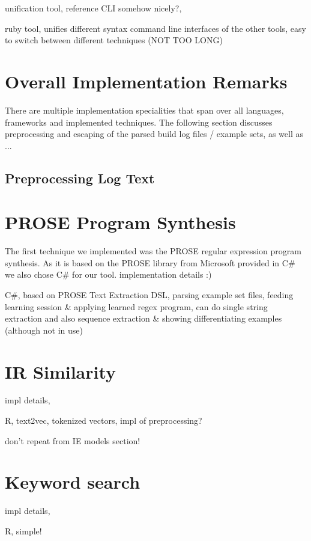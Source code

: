 \documentclass[\myrootdir/main.tex]{subfiles}
\begin{document}
unification tool, reference CLI somehow nicely?,

ruby tool, unifies different syntax command line interfaces of the other tools, easy to switch between different techniques (NOT TOO LONG)

\section{Overall Implementation Remarks}
There are multiple implementation specialities that span over all languages, frameworks and implemented techniques.
The following section discusses preprocessing and escaping of the parsed build log files / example sets, as well as ... 

\subsection*{Preprocessing Log Text}
\label{sec:impl-preprocessing}

\section{PROSE Program Synthesis}
\label{sec:impl-pbe}
The first technique we implemented was the PROSE regular expression program synthesis. As it is based on the PROSE library from Microsoft provided in C\# we also chose C\# for our tool. 
implementation details :)

C\#, based on PROSE Text Extraction DSL, parsing example set files, feeding learning session \& applying learned regex program, can do single string extraction and also sequence extraction \& showing differentiating examples (although not in use)

\section{IR Similarity}
\label{sec:impl-ts}
impl details,

R, text2vec, tokenized vectors, impl of preprocessing?

don't repeat from IE models section!

\section{Keyword search}
\label{sec:impl-skws}
impl details,

R, simple!
\end{document}
